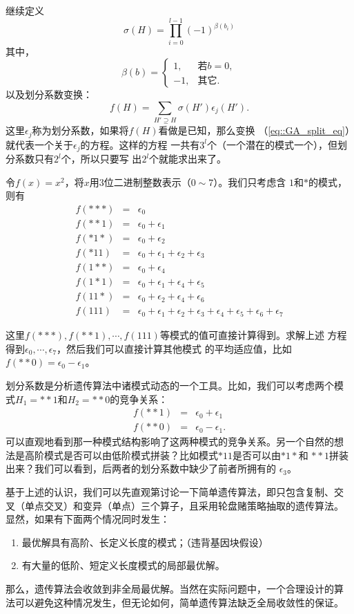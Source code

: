 继续定义
\begin{equation}
  \sigma(H) = \prod_{i = 0}^{l - 1}(-1)^{\beta(b_i)}
  \label{eq::GA_bit_filter}
\end{equation}
其中，
\begin{equation}
  \beta(b) = \left\{
  \begin{array}{ll}
    1, &\mbox{若}b = 0,\\
    -1, &\mbox{其它}.
  \end{array}
  \right.
  \label{eq::GA_bit_mark}
\end{equation}
以及划分系数变换：
\begin{equation}
  f(H) = \sum_{H' \supseteq H} \sigma(H')\epsilon_j(H').
  \label{eq::GA_split_eq}
\end{equation}
这里$\epsilon_j$称为划分系数，如果将$f(H)$看做是已知，那么变换
（\ref{eq::GA_split_eq}）就代表一个关于$\epsilon_j$的方程。这样的方程
一共有$3^l$个（一个潜在的模式一个），但划分系数只有$2^l$个，所以只要写
出$2^l$个就能求出来了。

\begin{example}
  令$f(x) = x^2$，将$x$用$3$位二进制整数表示（$0 \sim 7$）。我们只考虑含
  $1$和$*$的模式，则有
  \begin{eqnarray*}
    f(***) & = & \epsilon_0\\
    f(**1) & = & \epsilon_0 + \epsilon_1 \\
    f(*1*) & = & \epsilon_0 + \epsilon_2 \\
    f(*11) & = & \epsilon_0 + \epsilon_1 + \epsilon_2 + \epsilon_3 \\
    f(1**) & = & \epsilon_0 + \epsilon_4\\
    f(1*1) & = & \epsilon_0 + \epsilon_1 + \epsilon_4 + \epsilon_5\\
    f(11*) & = & \epsilon_0 + \epsilon_2 + \epsilon_4 + \epsilon_6\\
    f(111) & = & \epsilon_0 + \epsilon_1 + \epsilon_2 + \epsilon_3 + \epsilon_4 + \epsilon_5 + \epsilon_6 + \epsilon_7
  \end{eqnarray*}

这里$f(***), f(**1), \cdots, f(111)$等模式的值可直接计算得到。求解上述
方程得到$\epsilon_0, \cdots, \epsilon_7$，然后我们可以直接计算其他模式
的平均适应值，比如$f(**0) = \epsilon_0 - \epsilon_1$。
\end{example}

划分系数是分析遗传算法中诸模式动态的一个工具。比如，我们可以考虑两个模
式$H_1 = **1$和$H_2=**0$的竞争关系：
\begin{eqnarray*}
  f(**1) & = & \epsilon_0 + \epsilon_1\\
  f(**0) & = & \epsilon_0 - \epsilon_1.
\end{eqnarray*}
可以直观地看到那一种模式结构影响了这两种模式的竞争关系。另一个自然的想
法是高阶模式是否可以由低阶模式拼装？比如模式$*11$是否可以由$*1*$和
$**1$拼装出来？我们可以看到，后两者的划分系数中缺少了前者所拥有的
$\epsilon_3$。

基于上述的认识，我们可以先直观第讨论一下简单遗传算法，即只包含复制、交
叉（单点交叉）和变异（单点）三个算子，且采用轮盘赌策略抽取的遗传算法。
显然，如果有下面两个情况同时发生：
\begin{enumerate}
  \item 最优解具有高阶、长定义长度的模式；（违背基因块假设）
  \item 有大量的低阶、短定义长度模式的局部最优解。
\end{enumerate}
那么，遗传算法会收敛到非全局最优解。当然在实际问题中，一个合理设计的算
法可以避免这种情况发生，但无论如何，简单遗传算法缺乏全局收敛性的保证。
